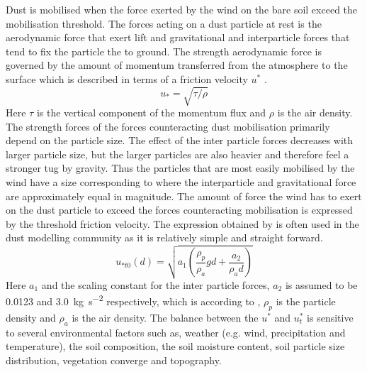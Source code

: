Dust is mobilised when the force exerted by the wind on the bare soil exceed the mobilisation threshold. The forces acting on a dust particle at rest is the aerodynamic force that exert lift and gravitational and interparticle forces that tend to fix the particle the to ground. 
The strength aerodynamic force is governed by the amount of momentum transferred from the atmosphere to the surface which is described in terms of a friction velocity $u^*$ \parencite{ShaoYaping2008PaMo}.
\begin{equation}
    u_* = \sqrt{\tau/\rho}
\end{equation}
Here $\tau$ is the vertical component of the momentum flux and $\rho$ is the air density. The strength forces of the forces counteracting dust mobilisation primarily depend on the particle size. The effect of the inter particle forces decreases with larger particle size, but the larger particles are also heavier and therefore feel a stronger tug by gravity. Thus the particles that are most easily mobilised by the wind have a size corresponding to where the interparticle and gravitational force are approximately equal in magnitude.     
The amount of force the wind has to exert on the dust particle to exceed the forces counteracting mobilisation is expressed by the threshold friction velocity. The expression obtained by \textcite{shao2000simple} is often used in the dust modelling community as it is relatively simple and straight forward. 
\begin{equation}
    u_{*t0}(d) = \sqrt{a_1 \left(\frac{\rho_p}{\rho_a}gd+\frac{a_2}{\rho_ad}\right)} 
\end{equation}
Here $a_1$ and the scaling constant for the inter particle forces, $a_2$  is assumed to be 0.0123 and \SI{3.0}{\kg\per\s\squared} respectively, which is  
according to \textcite{shao2000simple}, $\rho_p$ is the particle density and $\rho_a$ is the air density. 
The balance between the $u^*$ and $u^*_t$ is sensitive to several environmental factors such as, weather (e.g. wind, precipitation and temperature), the soil composition, the soil moisture content, soil particle size distribution, vegetation converge and topography.  
